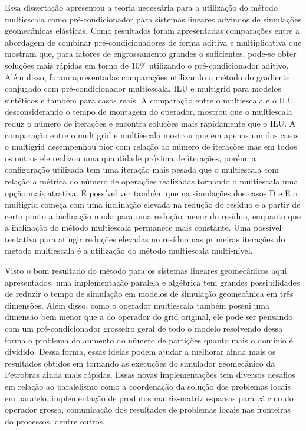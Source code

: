 
Essa dissertação apresentou a teoria necessária para a utilização do método multiescala como pré-condicionador para sistemas lineares advindos de simulações geomecânicas elásticas. Como resultados foram apresentadas comparações entre a abordagem de combinar pré-condicionadores de forma aditiva e multiplicativa que mostram que, para fatores de engrossamento grandes o suficientes, pode-se obter soluções mais rápidas em torno de 10\% utilizando o pré-condicionador aditivo. Além disso, foram apresentadas comparações utilizando o método do gradiente conjugado com pré-condicionador  multiescala, ILU e multigrid para modelos sintéticos e também para casos reais. A comparação entre o multiescala e o ILU, desconsiderando o tempo de montagem do operador, mostrou que o multiescala reduz o número de iterações e encontra soluções mais rapidamente que o ILU.  A comparação entre o multigrid e multiescala mostrou que em apenas um dos casos o multigrid desempenhou pior com relação ao número de iterações mas em todos os outros ele realizou uma quantidade próxima de iterações, porém, a configuração utilizada tem uma iteração mais pesada que o multiescala com relação a métrica do número de operações realizadas tornando o multiescala uma opção mais atrativa. É possível ver também que na simulações dos casos D e E o multigrid começa com uma inclinação elevada na redução do resíduo e a partir de certo ponto a inclinação muda para uma redução menor do resíduo, enquanto que a inclinação do método multiescala permanece mais constante. Uma possível tentativa para atingir reduções elevadas no resíduo nas primeiras iterações do método multiescala é a utilização do método multiescala multi-nível.

Visto o bom resultado do método para os sistemas lineares geomecânicos aqui apresentados, uma implementação paralela e algébrica tem grandes possibilidades de reduzir o tempo de simulação em modelos de simulação geomecânica em três dimensões. Além disso, como o operador multiescala também possui uma dimensão bem menor que a do operador do grid original, ele pode ser pensando com um pré-condicionador grosseiro geral de todo o modelo resolvendo dessa forma o problema do aumento do número de partições quanto mais o domínio é dividido. Dessa forma, essas ideias podem ajudar a melhorar ainda mais os resultados obtidos em \citet{geomecrio} tornando as execuções do simulador geomecânico da Petrobras ainda mais rápidas. Essas novas implementações tem diversos desafios em relação ao paralelismo como a coordenação da solução dos problemas locais em paralelo, implementação de produtos matriz-matriz esparsas para  cálculo do operador grosso, comunicação dos resultados de problemas locais nas fronteiras do processos, dentre outros.


